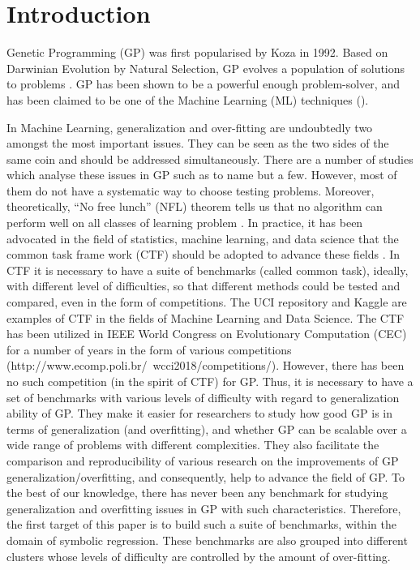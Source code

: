 \section{Introduction}
\label{Int}
Genetic Programming (GP) was first popularised by Koza \cite {1992Koza} in 1992. Based on Darwinian Evolution by Natural Selection, GP evolves a population of solutions to problems \cite{2008Poli}. GP has been shown to be a powerful enough problem-solver, and has been claimed to be one of the Machine Learning (ML) techniques (\cite{2008Poli}). \par

In Machine Learning, generalization and over-fitting are undoubtedly two amongst the most important issues. They can be seen as the two sides of the same coin and should be addressed simultaneously. There are a number of studies which analyse these issues in GP such as \cite{Fit2013}\cite{Goncalves2012}\cite{Goncalves2013}\cite{Hie2014}\cite{Hien2012}\cite{Uy2010}\cite{2014Uy}\cite{lu2018genetic}\cite{kurtoglu2017fiber}\cite{la2018multidimensional}\cite{haeri2017statistical} to name but a few. However, most of them do not have a systematic way to choose testing problems. Moreover, theoretically, “No free lunch” (NFL) theorem tells us that no algorithm can perform well on all classes of learning problem \cite{1996David}. In practice, it has been advocated in the field of statistics, machine learning, and data science that the common task frame work (CTF) should be adopted to advance these fields \cite{liberman2009,Donoho2017}. In CTF it is necessary to have a suite of benchmarks (called common task), ideally, with different level of difficulties, so that different methods could be tested and compared, even in the form of competitions. The UCI repository and Kaggle are examples of CTF in the fields of Machine Learning and Data Science. The CTF has been utilized in IEEE World Congress on Evolutionary Computation (CEC) for a number of years in the form of various competitions (http://www.ecomp.poli.br/~wcci2018/competitions/). However, there has been no such competition (in the spirit of CTF) for GP.
Thus, it is necessary to have a set of benchmarks with various levels of difficulty with regard to generalization ability of GP. They make it easier for researchers to study how good GP is in terms of generalization (and overfitting), and whether GP can be scalable over a wide range of problems with different complexities. They also facilitate the comparison and reproducibility of various research on the improvements of GP generalization/overfitting, and consequently, help to advance the field of GP.
To the best of our knowledge, there has never been any benchmark for studying generalization and overfitting issues in GP with such characteristics. Therefore, the first target of this paper is to build such a suite of benchmarks, within the domain of symbolic regression. These benchmarks are also grouped into different clusters whose levels of difficulty are controlled by the amount of over-fitting. \par

